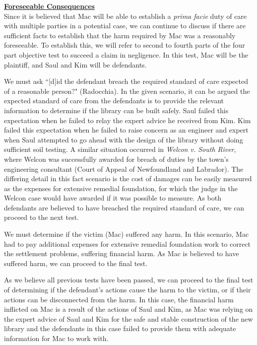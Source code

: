 \documentclass[12pt,letterpaper]{article}
\begin{document}
\par
\textbf{\underline{Foreseeable Consequences}}\\
\indent
Since it is believed that Mac will be able to establish a \textit{prima facie} duty of care with multiple parties in a potential case, we can continue to discuss if there are sufficient facts to establish that the harm required by Mac was a reasonably foreseeable. To establish this, we will refer to second to fourth parts of the four part objective test to succeed a claim in negligence. In this test, Mac will be the plaintiff, and Saul and Kim will be defendants.\par
We must ask ``[d]id the defendant breach the required standard of care expected of a reasonable person?" (Radocchia). In the given scenario, it can be argued the expected standard of care from the defendants is to provide the relevant information to determine if the library can be built safely. Saul failed this expectation when he failed to relay the expert advice he received from Kim. Kim failed this expectation when he failed to raise concern as an engineer and expert when Saul attempted to go ahead with the design of the library without doing sufficient soil testing. A similar situation occurred in \textit{Welcon v. South River}, where Welcon was successfully awarded for breach of duties by the town's engineering consultant (Court of Appeal of Newfoundland and Labrador). The differing detail in this fact scenario is the cost of damages can be easily measured as the expenses for extensive remedial foundation, for which the judge in the Welcon case would have awarded if it was possible to measure. As both defendants are believed to have breached the required standard of care, we can proceed to the next test.\par
We must determine if the victim (Mac) suffered any harm. In this scenario, Mac had to pay additional expenses for extensive remedial foundation work to correct the settlement problems, suffering financial harm. As Mac is believed to have suffered harm, we can proceed to the final test.\par
As we believe all previous tests have been passed, we can proceed to the final test of determining if the defendant's actions cause the harm to the victim, or if their actions can be disconnected from the harm. In this case, the financial harm inflicted on Mac is a result of the actions of Saul and Kim, as Mac was relying on the expert advice of Saul and Kim for the safe and stable construction of the new library and the defendants in this case failed to provide them with adequate information for Mac to work with.
\end{document}
